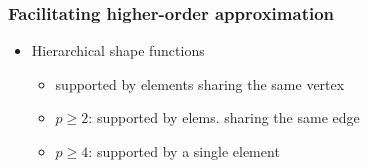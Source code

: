 \begin{frame}[c]
	\frametitle{Facilitating higher-order approximation}
	\begin{itemize}\addtolength{\itemsep}{-.25\baselineskip}
	\item \alert{Hierarchical shape functions}
			\begin{itemize}
     		\item	\textit{} supported by elements sharing the same vertex
     		\item<2-> \alert<2>{$p\geq 2$:} \textit{} supported by elems. sharing the same edge
     		\item<3-> \alert<3>{$p\geq 4$:} \textit{} supported by a single element
			\end{itemize}
	\end{itemize}
\end{frame}
